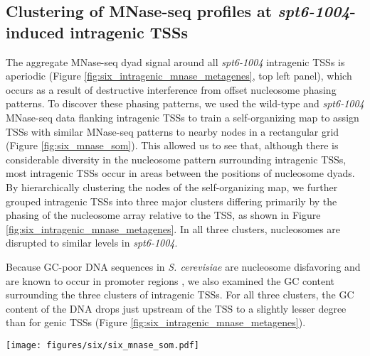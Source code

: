 \clearpage
\subsection[Clustering of MNase-seq profiles at\\ \textit{spt6-1004}-induced intragenic TSSs]{Clustering of MNase-seq profiles at \textit{spt6-1004}-induced intragenic TSSs}

The aggregate MNase-seq dyad signal around all \textit{spt6-1004} intragenic TSSs is aperiodic (Figure \ref{fig:six_intragenic_mnase_metagenes}, top left panel), which occurs as a result of destructive interference from offset nucleosome phasing patterns.
To discover these phasing patterns, we used the wild-type and \textit{spt6-1004} MNase-seq data flanking intragenic TSSs to train a self-organizing map to assign TSSs with similar MNase-seq patterns to nearby nodes in a rectangular grid (Figure \ref{fig:six_mnase_som}).
This allowed us to see that, although there is considerable diversity in the nucleosome pattern surrounding intragenic TSSs, most intragenic TSSs occur in areas between the positions of nucleosome dyads.
By hierarchically clustering the nodes of the self-organizing map, we further grouped intragenic TSSs into three major clusters differing primarily by the phasing of the nucleosome array relative to the TSS, as shown in Figure \ref{fig:six_intragenic_mnase_metagenes}.
In all three clusters, nucleosomes are disrupted to similar levels in \textit{spt6-1004}.

Because GC-poor DNA sequences in \textit{S. cerevisiae} are nucleosome disfavoring and are known to occur in promoter regions \citep{iyer1995,kaplan2008,tillo2009,zhang2009}, we also examined the GC content surrounding the three clusters of intragenic TSSs.
For all three clusters, the GC content of the DNA drops just upstream of the TSS to a slightly lesser degree than for genic TSSs (Figure \ref{fig:six_intragenic_mnase_metagenes}).

\begin{sidewaysfigure}
    \centering
    \texttt{[image: figures/six/six\_mnase\_som.pdf]}
    \caption[Average MNase-seq dyad signal around all \textit{spt6-1004}-induced intragenic TSSs, grouped by a self-organizing map of the MNase-seq signal.]{Average MNase-seq dyad signal around all \textit{spt6-1004}-induced intragenic TSSs, grouped by assignment to nodes of a 6x8 super-organizing map (SOM). The number of TSSs assigned to each node is shown in the upper right of each panel, and is shaded by the node's assignment to a cluster determined by agglomerative hierarchical clustering of the nodes. The solid line and shading are the median and inter-quartile range of the mean spike-in normalized coverage over two replicates (\textit{spt6-1004}) or one experiment (wild-type), in non-overlapping 5 bp bins.}
    \label{fig:six_mnase_som}
\end{sidewaysfigure}

